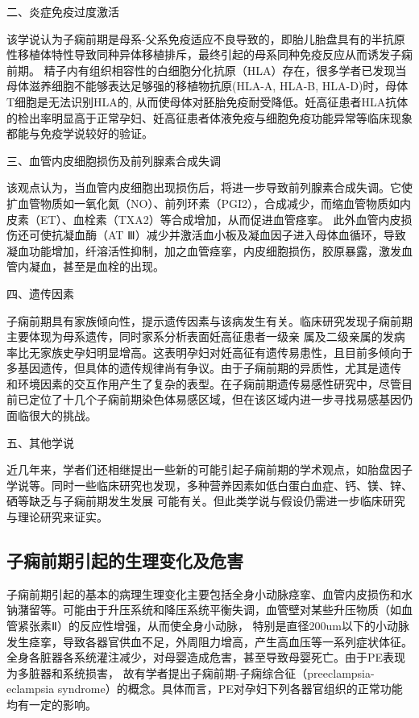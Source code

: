 二、炎症免疫过度激活

该学说认为子痫前期是母系-父系免疫适应不良导致的\cite{Sibai2005,OAG9,Shi2006}，即胎儿胎盘具有的半抗原性移植体特性导致同种异体移植排斥，最终引起的母系同种免疫反应从而诱发子痫前期。
精子内有组织相容性的白细胞分化抗原（HLA）存在，很多学者已发现当母体滋养细胞不能够表达足够强的移植物抗原(HLA-A, HLA-B, HLA-D)\cite{Moffett2002}时，母体T细胞是无法识别HLA的,
从而使母体对胚胎免疫耐受降低。妊高征患者HLA抗体的检出率明显高于正常孕妇、妊高征患者体液免疫与细胞免疫功能异常等临床现象都能与免疫学说较好的验证。

三、血管内皮细胞损伤及前列腺素合成失调

该观点认为，当血管内皮细胞出现损伤后，将进一步导致前列腺素合成失调\cite{OAG9,Sibai2005}。它使扩血管物质如一氧化氮（NO）、前列环素（PGI2），合成减少，而缩血管物质如内皮素（ET）、血栓素（TXA2）等合成增加，从而促进血管痉挛。
此外血管内皮损伤还可使抗凝血酶（AT Ⅲ）减少并激活血小板及凝血因子进入母体血循环，导致凝血功能增加，纤溶活性抑制，加之血管痉挛，内皮细胞损伤，胶原暴露，激发血管内凝血，甚至是血栓的出现。

四、遗传因素

子痫前期具有家族倾向性，提示遗传因素与该病发生有关\cite{OAG9,Sibai2005}。临床研究发现子痫前期主要体现为母系遗传，同时家系分析表面妊高征患者一级亲
属及二级亲属的发病率比无家族史孕妇明显增高\cite{Ge2013}。这表明孕妇对妊高征有遗传易患性，且目前多倾向于多基因遗传，但具体的遗传规律尚有争议。由于子痫前期的异质性，尤其是遗传
和环境因素的交互作用产生了复杂的表型。在子痫前期遗传易感性研究中，尽管目前已定位了十几个子痫前期染色体易感区域，但在该区域内进一步寻找易感基因仍面临很大的挑战。

五、其他学说

近几年来，学者们还相继提出一些新的可能引起子痫前期的学术观点，如胎盘因子学说\cite{Shi2006}等。同时一些临床研究也发现，多种营养因素如低白蛋白血症、钙、镁、锌、硒等缺乏与子痫前期发生发展
可能有关\cite{OAG9}。但此类学说与假设仍需进一步临床研究与理论研究来证实。

\subsection{子痫前期引起的生理变化及危害}
子痫前期引起的基本的病理生理变化主要包括全身小动脉痉挛、血管内皮损伤和水钠潴留等。可能由于升压系统和降压系统平衡失调，血管壁对某些升压物质（如血管紧张素Ⅱ）的反应性增强，从而使全身小动脉，
特别是直径200um以下的小动脉发生痉挛，导致各器官供血不足，外周阻力增高，产生高血压等一系列症状体征。全身各脏器各系统灌注减少，对母婴造成危害，甚至导致母婴死亡。由于PE表现为多脏器和系统损害，
故有学者提出子痫前期-子痫综合征（preeclampsia-eclampsia syndrome）的概念\cite{a_hospital,OAG9}。具体而言，PE对孕妇下列各器官组织的正常功能均有一定的影响。

